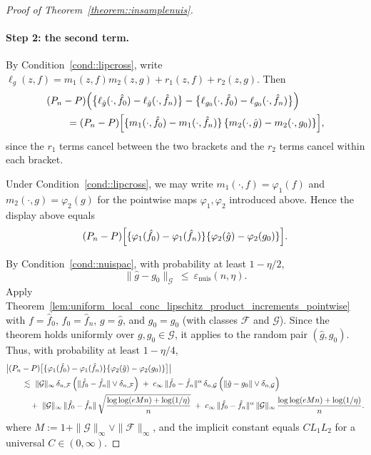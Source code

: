 \documentclass[11pt]{article}
\theoremstyle{plain}
\theoremstyle{definition} %
\begin{document}
\begin{proof}[Proof of Theorem~\ref{theorem::insamplenuis}]
\paragraph{Step 2: the second term.}
By Condition~\ref{cond::lipcross}, write
$\ell_g(z,f)=m_1(z,f)m_2(z,g)+r_1(z,f)+r_2(z,g)$. Then
\begin{align*}
&(P_n-P)\Bigl(\bigl\{\ell_{\hat g}(\cdot,\hat f_0)-\ell_{\hat g}(\cdot,\hat f_n)\bigr\}
-\bigl\{\ell_{g_0}(\cdot,\hat f_0)-\ell_{g_0}(\cdot,\hat f_n)\bigr\}\Bigr) \\
&\qquad=
(P_n-P)\Bigl[
\{m_1(\cdot,\hat f_0)-m_1(\cdot,\hat f_n)\}\,
\{m_2(\cdot,\hat g)-m_2(\cdot,g_0)\}
\Bigr],
\end{align*}
since the $r_1$ terms cancel between the two brackets and the $r_2$ terms cancel within each bracket.

Under Condition~\ref{cond::lipcross}, we may write $m_1(\cdot,f)=\varphi_1(f)$ and $m_2(\cdot,g)=\varphi_2(g)$ for the pointwise maps
$\varphi_1,\varphi_2$ introduced above. Hence the display above equals
\[
(P_n-P)\Bigl[\{\varphi_1(\hat f_0)-\varphi_1(\hat f_n)\}\{\varphi_2(\hat g)-\varphi_2(g_0)\}\Bigr].
\]

By Condition~\ref{cond::nuispac}, with probability at least $1-\eta/2$,
\[
\|\hat g-g_0\|_{\mathcal G}\ \le\ \varepsilon_{\mathrm{nuis}}(n,\eta).
\]
Apply Theorem~\ref{lem:uniform_local_conc_lipschitz_product_increments_pointwise} with
$f=\hat f_0$, $f_0=\hat f_n$, $g=\hat g$, and $g_0=g_0$ (with classes $\mathcal F$ and $\mathcal G$).
Since the theorem holds uniformly over $g,g_0\in\mathcal G$, it applies to the random pair $(\hat g,g_0)$.
Thus, with probability at least $1-\eta/4$,
\begin{align}
\label{eqn::secnuis_corrected}
&\bigl|(P_n-P)\bigl[\{\varphi_1(\hat f_0)-\varphi_1(\hat f_n)\}\{\varphi_2(\hat g)-\varphi_2(g_0)\}\bigr]\bigr|
\nonumber\\
&\qquad\lesssim\ 
\|\mathcal G\|_\infty\,
\delta_{n,\mathcal F}\,
\Bigl(\|\hat f_0-\hat f_n\|\vee \delta_{n,\mathcal F}\Bigr)
\;+\;
c_\infty\,
\|\hat f_0-\hat f_n\|^{\alpha}\,
\delta_{n,\mathcal G}\,
\Bigl(\|\hat g-g_0\|\vee \delta_{n,\mathcal G}\Bigr)
\nonumber\\
&\qquad\quad+\ 
\|\mathcal G\|_\infty\,
\|\hat f_0-\hat f_n\|\,
\sqrt{\frac{\log\log(eMn)+\log(1/\eta)}{n}}
\;+\;
c_\infty\,
\|\hat f_0-\hat f_n\|^{\alpha}\,\|\mathcal G\|_\infty\,
\frac{\log\log(eMn)+\log(1/\eta)}{n}.
\end{align}
where $M:=1+\|\mathcal G\|_\infty\vee \|\mathcal F\|_\infty$, and the implicit constant equals $CL_1L_2$ for a universal $C\in(0,\infty)$.



\end{proof}
\end{document}
